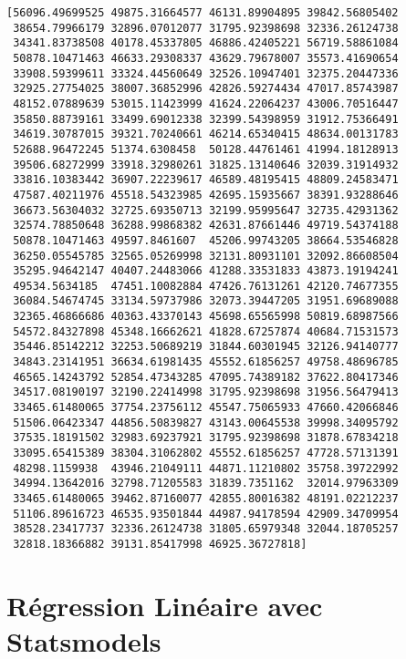 \documentclass[11pt]{article}
\begin{document}
    \begin{Verbatim}[commandchars=\\\{\}]
[56096.49699525 49875.31664577 46131.89904895 39842.56805402
 38654.79966179 32896.07012077 31795.92398698 32336.26124738
 34341.83738508 40178.45337805 46886.42405221 56719.58861084
 50878.10471463 46633.29308337 43629.79678007 35573.41690654
 33908.59399611 33324.44560649 32526.10947401 32375.20447336
 32925.27754025 38007.36852996 42826.59274434 47017.85743987
 48152.07889639 53015.11423999 41624.22064237 43006.70516447
 35850.88739161 33499.69012338 32399.54398959 31912.75366491
 34619.30787015 39321.70240661 46214.65340415 48634.00131783
 52688.96472245 51374.6308458  50128.44761461 41994.18128913
 39506.68272999 33918.32980261 31825.13140646 32039.31914932
 33816.10383442 36907.22239617 46589.48195415 48809.24583471
 47587.40211976 45518.54323985 42695.15935667 38391.93288646
 36673.56304032 32725.69350713 32199.95995647 32735.42931362
 32574.78850648 36288.99868382 42631.87661446 49719.54374188
 50878.10471463 49597.8461607  45206.99743205 38664.53546828
 36250.05545785 32565.05269998 32131.80931101 32092.86608504
 35295.94642147 40407.24483066 41288.33531833 43873.19194241
 49534.5634185  47451.10082884 47426.76131261 42120.74677355
 36084.54674745 33134.59737986 32073.39447205 31951.69689088
 32365.46866686 40363.43370143 45698.65565998 50819.68987566
 54572.84327898 45348.16662621 41828.67257874 40684.71531573
 35446.85142212 32253.50689219 31844.60301945 32126.94140777
 34843.23141951 36634.61981435 45552.61856257 49758.48696785
 46565.14243792 52854.47343285 47095.74389182 37622.80417346
 34517.08190197 32190.22414998 31795.92398698 31956.56479413
 33465.61480065 37754.23756112 45547.75065933 47660.42066846
 51506.06423347 44856.50839827 43143.00645538 39998.34095792
 37535.18191502 32983.69237921 31795.92398698 31878.67834218
 33095.65415389 38304.31062802 45552.61856257 47728.57131391
 48298.1159938  43946.21049111 44871.11210802 35758.39722992
 34994.13642016 32798.71205583 31839.7351162  32014.97963309
 33465.61480065 39462.87160077 42855.80016382 48191.02212237
 51106.89616723 46535.93501844 44987.94178594 42909.34709954
 38528.23417737 32336.26124738 31805.65979348 32044.18705257
 32818.18366882 39131.85417998 46925.36727818]
    \end{Verbatim}

    \hypertarget{ruxe9gression-linuxe9aire-avec-statsmodels}{%
\section{Régression Linéaire avec
Statsmodels}\label{ruxe9gression-linuxe9aire-avec-statsmodels}}
\end{document}
